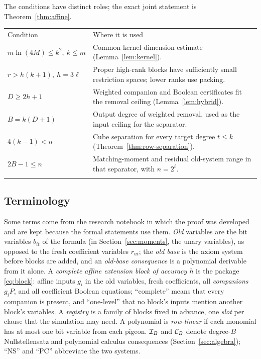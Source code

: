 The conditions have distinct roles; the exact joint statement is
Theorem~\ref{thm:affine}.
\begin{center}
\renewcommand{\arraystretch}{1.4}
\begin{tabular}{@{}>{\raggedright\arraybackslash}p{}>{\raggedright\arraybackslash}p{}@{}}
\toprule
Condition & Where it is used\\\addlinespace[0.2em]
\midrule
\(m\ln(4M)\le k^2,\ k\le m\) & Common-kernel dimension estimate
(Lemma~\ref{lem:kernel}).\\\addlinespace[0.2em]
\(r>h(k+1),\ h=3\ell\) & Proper high-rank blocks have sufficiently
small restriction spaces; lower ranks use packing.\\\addlinespace[0.2em]
\(D\ge2h+1\) & Weighted companion and Boolean certificates fit the
removal ceiling (Lemma~\ref{lem:hybrid}).\\\addlinespace[0.2em]
\(B=k(D+1)\) & Output degree of weighted removal, used as the input
ceiling for the separator.\\\addlinespace[0.2em]
\(4(k-1)<n\) & Cube separation for every target degree \(t\le k\)
(Theorem~\ref{thm:row-separation}).\\\addlinespace[0.2em]
\(2B-1\le n\) & Matching-moment and residual old-system range in
that separator, with \(n=2^\ell\).\\\addlinespace[0.2em]
\bottomrule
\end{tabular}
\end{center}

\subsection{Terminology}
Some terms come from the research notebook in which the proof was developed
and are kept because the formal statements use them.
\emph{Old} variables are the bit variables \(b_{it}\) of the formula (in
Section~\ref{sec:moments}, the unary variables), as opposed to the fresh
coefficient variables \(r_{ui}\); the \emph{old base} is the axiom system
before blocks are added, and an \emph{old-base consequence} is a polynomial
derivable from it alone. A \emph{complete affine extension block of
accuracy \(h\)} is the package \eqref{eq:block}: affine inputs \(g_i\) in
the old variables, fresh coefficients, all \emph{companions} \(g_iP\), and
all coefficient Boolean equations; ``complete'' means that every companion
is present, and ``one-level'' that no block's inputs mention another
block's variables. A \emph{registry} is a family of blocks fixed in advance,
one \emph{slot} per clause that the simulation may need. A polynomial is
\emph{row-linear} if each monomial has at most one bit variable from each
pigeon. \(\mathcal I_B\) and \(\mathcal C_B\) denote degree-\(B\) Nullstellensatz and
polynomial calculus consequences (Section~\ref{sec:algebra}); ``NS'' and
``PC'' abbreviate the two systems.

